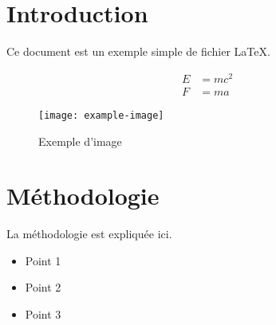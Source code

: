 \documentclass{article}
\begin{document}
\section{Introduction}
Ce document est un exemple simple de fichier LaTeX.

    \begin{align*}
E &= mc^2 \\
        F &= ma
  \end{align*}

\begin{figure}[h]
\centering
\texttt{[image: example-image]}
\caption{Exemple d'image}
\end{figure}

\section{Méthodologie}
    La méthodologie est expliquée ici.

    \begin{itemize}
\item Point 1
    \item Point 2
  \item Point 3\\
    \end{itemize}
\end{document}
